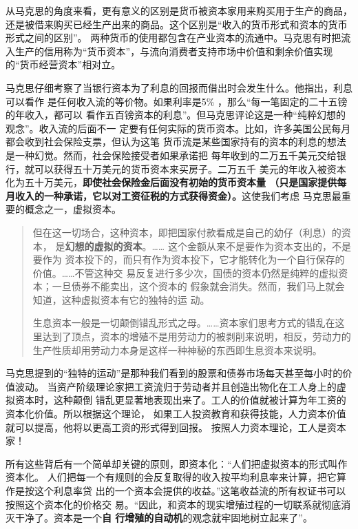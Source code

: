 从马克思的角度来看，更有意义的区别是货币被资本家用来购买用于生产的商品，还是被借来购买已经生产出来的商品。这个区别是“收入的货币形式和资本的货币形式之间的区别”。 两种货币的使用都包含在产业资本的流通中。马克思有时把流入生产的信用称为“货币资本”，与流向消费者支持市场中价值和剩余价值实现的“货币经营资本”相对立。

马克思仔细考察了当银行资本为了利息的回报而借出时会发生什么。他指出，利息可以看作
是任何收入流的等价物。如果利率是5\% ，那么“每一笔固定的二十五镑的年收入，都可以
看作五百镑资本的利息”。但马克思评论这是一种“纯粹幻想的观念”。收入流的后面不一
定要有任何实际的货币资本。比如，许多美国公民每月都会收到社会保险支票，但认为这笔
货币流是某些国家持有的资本的利息的想法是一种幻觉。然而，社会保险接受者如果承诺把
每年收到的二万五千美元交给银行，就可以获得五十万美元的货币资本来买房子。二万五千
美元的年收入被资本化为五十万美元，\textbf{即使社会保险金后面没有初始的货币资本量
  （只是国家提供每月收入的一种承诺，它以对工资征税的方式获得资金）。}这使我们考虑
马克思最重要的概念之一，虚拟资本。

\begin{quotation}
  但在这一切场合，这种资本，即把国家付款看成是自己的幼仔（利息）的资本，
  是\textbf{幻想的虚拟的资本}。…… 这个金额从来不是要作为资本支出的，不是要作为
  资本投下的，而只有作为资本投下，它才能转化为一个自行保存的价值。……不管这种交
  易反复进行多少次，国债的资本仍然是纯粹的虚拟资本；一旦债券不能卖出，这个资本的
  假象就会消失。然而，我们马上就会知道，这种虚拟资本有它的独特的运
  动。

生息资本一般是一切颠倒错乱形式之母。……资本家们思考方式的错乱在这里达到了顶点，资本的增殖不是用劳动力的被剥削来说明，相反，劳动力的生产性质却用劳动力本身是这样一种神秘的东西即生息资本来说明。 
\end{quotation}

马克思提到的“独特的运动”是那种我们看到的股票和债券市场每天甚至每小时的价值波动。
当资产阶级理论家把工资流归于劳动者并且创造出物化在工人身上的虚拟资本时，这种颠倒
错乱更显著地表现出来了。工人的价值就被计算为年工资的资本化价值。所以根据这个理论，
如果工人投资教育和获得技能，人力资本价值就可以提高，他将以更高工资的形式得到回报。
按照人力资本理论，工人是资本家！

所有这些背后有一个简单却关键的原则，即资本化：“人们把虚拟资本的形式叫作资本化。
人们把每一个有规则的会反复取得的收入按平均利息率来计算，把它算作是按这个利息率贷
出的一个资本会提供的收益。”这笔收益流的所有权证书可以按照这个资本化的价格交
易。“因此，和资本的现实增殖过程的一切联系就彻底消灭干净了。资本是一个\textbf{自
  行增殖的自动机}的观念就牢固地树立起来了”。

